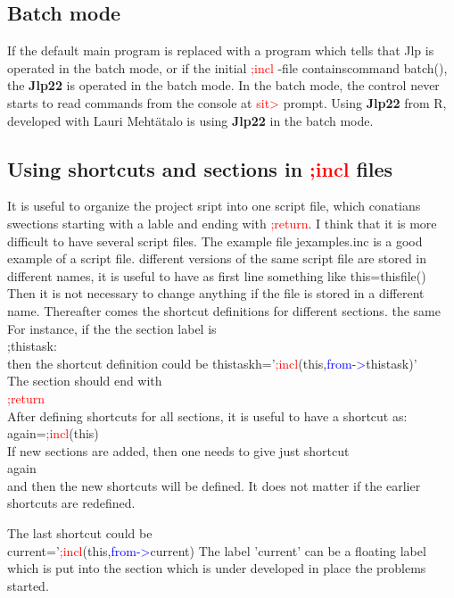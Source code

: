 \subsection{Batch mode}
\label{batch}
If the default main program is replaced with a program which tells that Jlp is operated
in the batch mode, or if the initial   \textcolor{Red}{;incl} -file containscommand \textcolor{VioletRed}{batch}(), the \textbf{Jlp22} is operated in
the batch mode. In the batch mode, the control never starts to read commands from the
console at \textcolor{Red}{sit>} prompt. Using \textbf{Jlp22} from R, developed with Lauri Meht\"atalo is using \textbf{Jlp22} in the batch mode.
\subsection{Using shortcuts and sections in \textcolor{Red}{;incl} files}
\label{operation2}

It is useful to organize
the project sript into one script file, which conatians swections starting with a lable and ending
with \textcolor{Red}{;return}.
I think that it is more difficult to have several script files.
The example file jexamples.inc is a good example of a script file.
different versions of the same script file are stored in different names, it is useful to have
as first line something like
this=\textcolor{VioletRed}{thisfile}()\\
Then it is not necessary to change anything if the file is stored in a different name.
Thereafter comes the shortcut definitions for different sections.
the same
For instance, if the the section
label is \\
;thistask:\\
then the shortcut definition could be
thistaskh='\textcolor{Red}{;incl}(this,\textcolor{blue}{from->}thistask)'\\

The section should end with\\
\textcolor{Red}{;return}\\
After defining shortcuts for all sections, it is useful to have a shortcut as:\\
again=\textcolor{Red}{;incl}(this)\\
If new sections are added, then one needs to give just shortcut\\
again\\
and then the new shortcuts will be defined. It does not matter if the earlier shortcuts are redefined.

The last shortcut could be \\
current='\textcolor{Red}{;incl}(this,\textcolor{blue}{from->}current)
The label 'current' can be a floating label which is put into the section which is under developed
in place the problems started.

